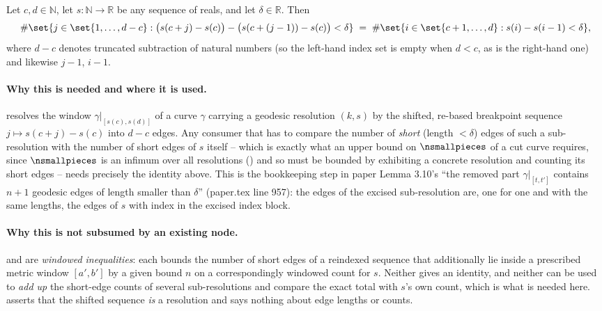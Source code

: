 \begin{lemma}
  Let $c,d \in \mathbb{N}$, let $s \colon \mathbb{N} \to \mathbb{R}$ be any sequence of reals, and
  let $\delta \in \mathbb{R}$. Then
  \[
    \#\set{j \in \set{1,\dots,d-c} : \bigl(s(c+j)-s(c)\bigr) - \bigl(s(c+(j-1))-s(c)\bigr) < \delta}
    \;=\;
    \#\set{i \in \set{c+1,\dots,d} : s(i)-s(i-1) < \delta}
    ,
  \]
  where $d-c$ denotes truncated subtraction of natural numbers (so the left-hand index set is
  empty when $d < c$, as is the right-hand one) and likewise $j-1$, $i-1$.

  \paragraph{Why this is needed and where it is used.}  resolves
  the window $\gamma|_{[s(c),s(d)]}$ of a curve $\gamma$ carrying a geodesic resolution $(k,s)$ by
  the shifted, re-based breakpoint sequence $j \mapsto s(c+j)-s(c)$ into $d-c$ edges. Any
  consumer that has to compare the number of \emph{short} (length $<\delta$) edges of such a
  sub-resolution with the number of short edges of $s$ itself -- which is exactly what an upper
  bound on $\nsmallpieces$ of a cut curve requires, since $\nsmallpieces$ is an infimum over all
  resolutions () and so must be bounded by exhibiting a concrete
  resolution and counting its short edges -- needs precisely the identity above. This is the
  bookkeeping step in paper Lemma 3.10's ``the removed part $\gamma|_{[t,t']}$ contains $n+1$
  geodesic edges of length smaller than $\delta$'' (paper.tex line 957): the edges of the excised
  sub-resolution are, one for one and with the same lengths, the edges of $s$ with index in the
  excised index block.

  \paragraph{Why this is not subsumed by an existing node.}
   and  are
  \emph{windowed inequalities}: each bounds the number of short edges of a reindexed sequence that
  additionally lie inside a prescribed metric window $[a',b']$ by a given bound $n$ on a
  correspondingly windowed count for $s$. Neither gives an identity, and neither can be used to
  \emph{add up} the short-edge counts of several sub-resolutions and compare the exact total with
  $s$'s own count, which is what is needed here.  asserts that
  the shifted sequence \emph{is} a resolution and says nothing about edge lengths or counts.
\end{lemma}
